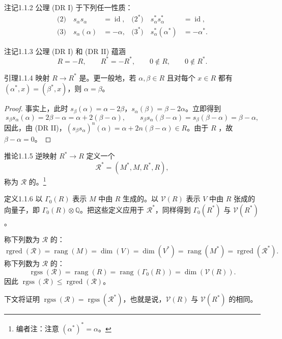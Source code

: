\begin{SGAresult}{注记}{1.1.2}
公理 (DR I) 于下列任一性质：
\begin{align*}
\text{(2)}\quad s_\alpha s_\alpha&=\operatorname{id},&\text{($2^*$)}\quad s_\alpha^*s_\alpha^*&=\operatorname{id},\\
\text{(3)}\quad s_\alpha(\alpha)&=-\alpha,&\text{($3^*$)}\quad s_\alpha^*(\alpha^*)&=-\alpha^*.
\end{align*}
\end{SGAresult}
\begin{SGAresult}{注记}{1.1.3}
公理 (DR I) 和 (DR II) 蕴涵
\[R=-R,\qquad R^*=-R^*,\qquad 0\notin R,\qquad0\notin R^*.\]
\end{SGAresult}
\begin{SGAresult}{引理}{1.1.4}
映射 $R\to R^*$ 是。更一般地，若 $\alpha,\beta\in R$ 且对每个 $x\in R$ 都有 $(\alpha^*,x)=(\beta^*,x)$，则 $\alpha=\beta$。
\end{SGAresult}
\begin{proof}
事实上，此时 $s_\beta(\alpha)=\alpha-2\beta$，$s_\alpha(\beta)=\beta-2\alpha$。立即得到
\[
s_\beta s_\alpha(\alpha)=2\beta-\alpha=\alpha+2(\beta-\alpha),\qquad
s_\beta s_\alpha(\beta-\alpha)=s_\beta(\beta-\alpha)=\beta-\alpha,
\]
因此，由 (DR II)，$(s_\beta s_\alpha)^n(\alpha)=\alpha+2n(\beta-\alpha)\in R$。由于 $R$ ，故 $\beta-\alpha=0$。
\end{proof}
\begin{SGAresult}{推论}{1.1.5}
逆映射 $R^*\to R$ 定义一个
\[\mathscr R^*=(M^*,M,R^*,R),\]
称为 $\mathscr R$ 的。\footnote{编者注：注意 $(\alpha^*)^*=\alpha$。}
\end{SGAresult}
\begin{SGAresult}{定义}{1.1.6}
以 $\Gamma_0(R)$ 表示 $M$ 中由 $R$ 生成的。以 $\mathscr V(R)$ 表示 $V$ 中由 $R$ 张成的向量子，即 $\Gamma_0(R)\otimes\mathbb Q$。把这些定义应用于 $\mathscr R^*$，同样得到 $\Gamma_0(R^*)$ 与 $\mathscr V(R^*)$。

称下列数为 $\mathscr R$ 的：
\[\operatorname{rgred}(\mathscr R)=\operatorname{rang}(M)=\dim(V)=\dim(V^*)=\operatorname{rang}(M^*)=\operatorname{rgred}(\mathscr R^*).\]
称下列数为 $\mathscr R$ 的：
\[\operatorname{rgss}(\mathscr R)=\operatorname{rang}(R)=\operatorname{rang}(\Gamma_0(R))=\dim(\mathscr V(R)).\]
因此 $\operatorname{rgss}(\mathscr R)\leq\operatorname{rgred}(\mathscr R)$。

下文将证明 $\operatorname{rgss}(\mathscr R)=\operatorname{rgss}(\mathscr R^*)$，也就是说，$\mathscr V(R)$ 与 $\mathscr V(R^*)$ 的相同。
\end{SGAresult}
